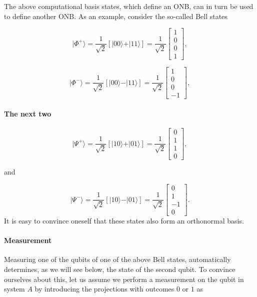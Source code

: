 The above computational basis states, which define an ONB, can in turn
be used to define another ONB. As an example, consider the so-called
Bell states

\[
\vert \Phi^+\rangle = \frac{1}{\sqrt{2}}\left[\vert 00\rangle +\vert 11\rangle\right]=\frac{1}{\sqrt{2}}\begin{bmatrix} 1 \\ 0 \\ 0 \\ 1\end{bmatrix},
\]

\[
\vert \Phi^-\rangle = \frac{1}{\sqrt{2}}\left[\vert 00\rangle -\vert 11\rangle\right]=\frac{1}{\sqrt{2}}\begin{bmatrix} 1 \\ 0 \\ 0 \\ -1\end{bmatrix},
\]


\paragraph{The next two}

\[
\vert \Psi^+\rangle = \frac{1}{\sqrt{2}}\left[\vert 10\rangle +\vert 01\rangle\right]=\frac{1}{\sqrt{2}}\begin{bmatrix} 0 \\ 1 \\ 1 \\ 0\end{bmatrix},
\]

and

\[
\vert \Psi^-\rangle = \frac{1}{\sqrt{2}}\left[\vert 10\rangle -\vert 01\rangle\right]=\frac{1}{\sqrt{2}}\begin{bmatrix} 0 \\ 1 \\ -1 \\ 0\end{bmatrix}.
\]
It is easy to convince oneself that these states also form an orthonormal basis. 


\paragraph{Measurement}

Measuring one of the qubits of one of the above Bell states,
automatically determines, as we will see below, the state of the
second qubit. To convince ourselves about this, let us assume we perform a measurement on the qubit in system $A$ by introducing the projections with outcomes $0$ or $1$ as

